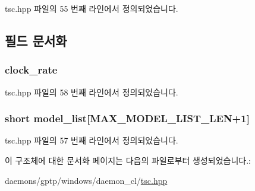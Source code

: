 tsc.\+hpp 파일의 55 번째 라인에서 정의되었습니다.



\subsection{필드 문서화}
\subsubsection[{\texorpdfstring{clock\+\_\+rate}{clock_rate}}]{ clock\+\_\+rate}\hypertarget{struct_model_number_system_clock_rate_mapping_a4ff69d868409c6c16c86cab87ee0a3bf}{}\label{struct_model_number_system_clock_rate_mapping_a4ff69d868409c6c16c86cab87ee0a3bf}


tsc.\+hpp 파일의 58 번째 라인에서 정의되었습니다.

\subsubsection[{\texorpdfstring{model\+\_\+list}{model_list}}]{\setlength{\rightskip}{0pt plus 5cm}short model\+\_\+list\mbox{[}{\bf M\+A\+X\+\_\+\+M\+O\+D\+E\+L\+\_\+\+L\+I\+S\+T\+\_\+\+L\+EN}+1\mbox{]}}\hypertarget{struct_model_number_system_clock_rate_mapping_a6b617b9adf3a5925c8ebeb9765c5685f}{}\label{struct_model_number_system_clock_rate_mapping_a6b617b9adf3a5925c8ebeb9765c5685f}


tsc.\+hpp 파일의 57 번째 라인에서 정의되었습니다.



이 구조체에 대한 문서화 페이지는 다음의 파일로부터 생성되었습니다.\+:\begin{DoxyCompactItemize}
\item 
daemons/gptp/windows/daemon\+\_\+cl/\hyperlink{tsc_8hpp}{tsc.\+hpp}\end{DoxyCompactItemize}
